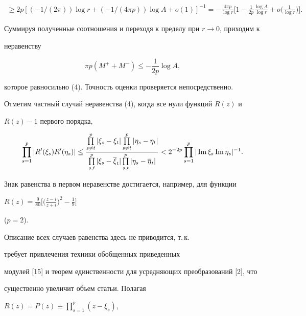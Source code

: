 \begin{pf}
\begin{multline*}
%


\geq 2p[(-1/(2\pi))\log r+(-1/(4\pi p))\log A+o(1)]^{-1}= 


-\frac{4\pi p}{\log r}\bigg[1-\frac{1}{2p}\frac{\log A}{\log r}+


o\bigg(\frac{1}{\log r}\bigg)\bigg].


\end{multline*}


Суммируя полученные соотношения и переходя к пределу при $r\to 0$, приходим к


неравенству


$$


\pi p(M^{+}+M^{-})\leq -\frac{1}{2p}\log A,


$$


которое равносильно (4). Точность оценки проверяется непосредственно.


\end{pf}





Отметим частный случай неравенства (4), когда все нули функций $R(z)$ и


$R(z)-1$ первого порядка,


$$


\prod\limits_{s=1}^{p}|R'(\xi_{s})R'(\eta_{s})|\leq


\frac{\prod\limits_{s\neq t}^{p}|\xi_s-\xi_t|\prod


\limits_{s\neq t}^{p}|\eta_{s}-\eta_{t}|}


{\prod\limits_{s,t}^{p}|\xi_{s}-\overline{\xi}_{t}|\prod\limits_{s,t}^{p}


|\eta_{s}-\overline{\eta}_{t}|}


<2^{-2p}\prod\limits_{s=1}^{p}|\im \xi_{s} \im \eta_{s}|^{-1}.


$$


Знак равенства в первом неравенстве достигается, например, для функции


$R(z)=\frac{9}{80}\big[\big(\frac{z-i}{z+i}\big)^2-\frac{1}{9}\big]$


($p=2$).


Описание всех случаев равенства здесь не приводится, т.\,к.


требует привлечения техники обобщенных приведенных


модулей [15] и теорем единственности для усредняющих преобразований [2], что


существенно увеличит объем статьи. Полагая


$R(z)=P(z)\equiv\prod\limits_{s=1}^{p}(z-\xi_s)$,


